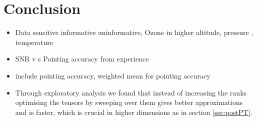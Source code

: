\chapter{Conclusion}

\begin{itemize}
	\item Data sensitive informative uninformative, Ozone in higher altitude, pressure , temperature
	\item SNR v s Pointing accuracy from experience
	\item include pointing accuracy, weighted mean for pointing accuracy
	\item Through exploratory analysis we found that instead of increasing the ranks optimising the tensors by sweeping over them gives better approximations and is faster, which is crucial in higher dimensions as in section \ref{sec:postPT}.
\end{itemize}